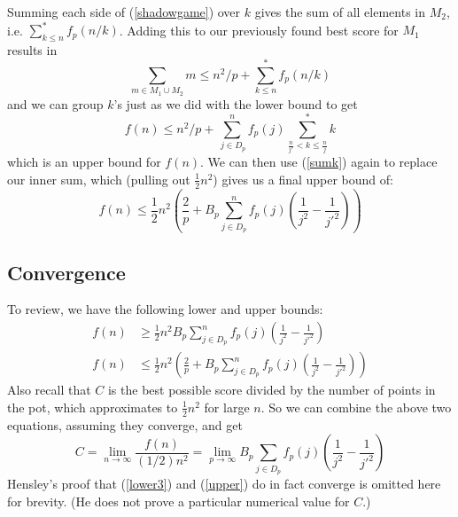 \documentclass[a4paper,10pt]{amsart} %
\begin{document}
Summing each side of (\ref{shadowgame}) over $k$ gives the sum of all elements in $M_2$, i.e. $\sum_{k \leq n}^* f_p(n/k)$. Adding this to our previously found best score for $M_1$ results in 
\begin{equation*}
    \sum_{m \in M_1 \cup M_2} m \leq n^2 / p + \sum_{k \leq n}^* f_p(n/k)
\end{equation*}
and we can group $k$'s just as we did with the lower bound to get 
\begin{equation}
    f(n) \leq n^2 / p + \sum_{\ j \in D_p}^n f_p (j) \sum_{\frac{n}{j'}<k \leq \frac{n}{j}}^* k
\end{equation}
which is an upper bound for $f(n)$. We can then use (\ref{sumk}) again to replace our inner sum, which (pulling out $\frac{1}{2}n^2$) gives us a final upper bound of:
\begin{equation} \label{upper}
        f(n) \leq \frac{1}{2} n^2 \left( \frac{2}{p} + B_p\sum_{j \in D_p}^n f_p (j) (\frac{1}{j^2} - \frac{1}{j'^2}) \right)
\end{equation}

\subsection{Convergence} \label{convergence}
To review, we have the following lower and upper bounds:
\begin{align*}
    f(n) &\geq \frac{1}{2} n^2 B_p \sum_{j \in D_p}^n f_p(j) (\frac{1}{j^2} - \frac{1}{j'^2}) \\
    f(n) &\leq \frac{1}{2} n^2 \left( \frac{2}{p} + B_p\sum_{j \in D_p}^n f_p (j) (\frac{1}{j^2} - \frac{1}{j'^2}) \right)
\end{align*}
Also recall that $C$ is the best possible score divided by the number of points in the pot, which approximates to $\frac{1}{2}n^2$ for large $n$. So we can combine the above two equations, assuming they converge, and get
\begin{equation}
    C = \lim_{n \to \infty} \frac{f(n)}{(1/2)n^2} = \lim_{p \to \infty} B_p \sum_{j \in D_p} f_p(j) \left(\frac{1}{j^2} - \frac{1}{j'^2} \right)
\end{equation}
Hensley's proof that (\ref{lower3}) and (\ref{upper}) do in fact converge is omitted here for brevity. (He does not prove a particular numerical value for $C$.)
\end{document}
